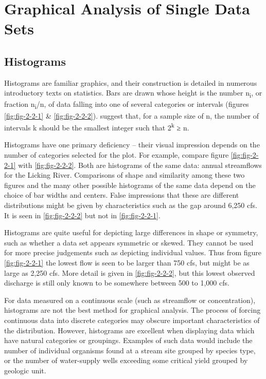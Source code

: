 \documentclass[]{book}
\begin{document}
\hypertarget{ch2-1}{%
\section{Graphical Analysis of Single Data Sets}\label{ch2-1}}

\hypertarget{histograms}{%
\subsection{Histograms}\label{histograms}}

Histograms are familiar graphics, and their construction is detailed in numerous introductory texts on statistics. Bars are drawn whose height is the number n\textsubscript{i}, or fraction n\textsubscript{i}/n, of data falling into one of several categories or intervals (figures \ref{fig:fig-2-2-1} \& \ref{fig:fig-2-2-2}). \citet{iman_modern_1983} suggest that, for a sample size of n, the number of intervals k should be the smallest integer such that 2\textsuperscript{k} ≥ n.

Histograms have one primary deficiency -- their visual impression depends on the number of categories selected for the plot. For example, compare figure \ref{fig:fig-2-2-1} with \ref{fig:fig-2-2-2}. Both are histograms of the same data: annual streamflows for the Licking River. Comparisons of shape and similarity among these two figures and the many other possible histograms of the same data depend on the choice of bar widths and centers. False impressions that these are different distributions might be given by characteristics such as the gap around 6,250 cfs. It is seen in \ref{fig:fig-2-2-2} but not in \ref{fig:fig-2-2-1}.

Histograms are quite useful for depicting large differences in shape or symmetry, such as whether a data set appears symmetric or skewed. They cannot be used for more precise judgements such as depicting individual values. Thus from figure \ref{fig:fig-2-2-1} the lowest flow is seen to be larger than 750 cfs, but might be as large as 2,250 cfs. More detail is given in \ref{fig:fig-2-2-2}, but this lowest observed discharge is still only known to be somewhere between 500 to 1,000 cfs.

For data measured on a continuous scale (such as streamflow or concentration), histograms are not the best method for graphical analysis. The process of forcing continuous data into discrete categories may obscure important characteristics of the distribution. However, histograms are excellent when displaying data which have natural categories or groupings. Examples of such data would include the number of individual organisms found at a stream site grouped by species type, or the number of water-supply wells exceeding some critical yield grouped by geologic unit.
\end{document}

